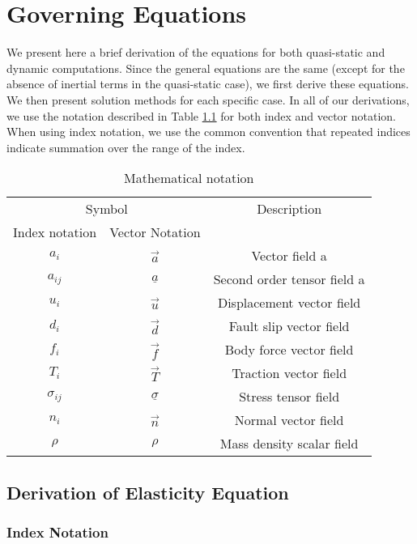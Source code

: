 
\chapter{\label{cha:Governing-Equations}Governing Equations}

We present here a brief derivation of the equations for both quasi-static
and dynamic computations. Since the general equations are the same
(except for the absence of inertial terms in the quasi-static case),
we first derive these equations. We then present solution methods
for each specific case. In all of our derivations, we use the notation
described in Table \ref{tab:Mathematical-notation} for both index
and vector notation. When using index notation, we use the common
convention that repeated indices indicate summation over the range
of the index.

\noindent \begin{center}
\begin{table}[H]
\caption{\label{tab:Mathematical-notation}Mathematical notation}


\noindent \centering{}\medskip{}
\begin{tabular}{|c|c|c|}
\hline 
\multicolumn{2}{|c|}{Symbol} & Description\tabularnewline
\cline{1-2} 
Index notation & Vector Notation & \tabularnewline
\hline 
\hline 
$a_{i}$ & $\overrightarrow{a}$ & Vector field a\tabularnewline
\hline 
$a_{ij}$ & $\underline{a}$ & Second order tensor field a\tabularnewline
\hline 
$u_{i}$ & $\overrightarrow{u}$ & Displacement vector field\tabularnewline
\hline 
$d_{i}$ & $\vec{{d}}$ & Fault slip vector field\tabularnewline
\hline 
$f_{i}$ & $\overrightarrow{f}$ & Body force vector field\tabularnewline
\hline 
$T_{i}$ & $\overrightarrow{T}$ & Traction vector field\tabularnewline
\hline 
$\sigma_{ij}$ & $\underline{\sigma}$ & Stress tensor field\tabularnewline
\hline 
$n_{i}$ & $\overrightarrow{n}$ & Normal vector field\tabularnewline
\hline 
$\rho$ & $\rho$ & Mass density scalar field\tabularnewline
\hline 
\end{tabular}
\end{table}

\par\end{center}


\section{Derivation of Elasticity Equation}


\subsection{Index Notation}

